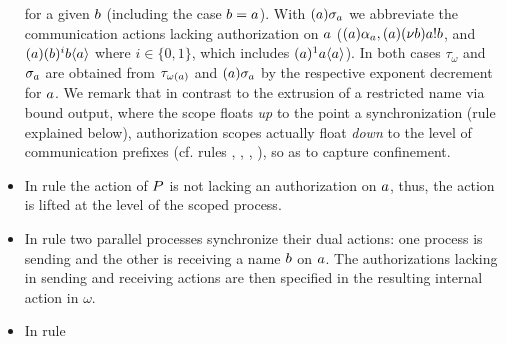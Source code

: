 \begin{itemize}
for a given $b$ (including the case $b = a$). With $(a)\sigma_a$ we abbreviate the communication actions lacking authorization on $a$ ($(a)\alpha_a, (a)(\nu b)a!b$, and 
$(a)(b)^ib\langle a\rangle$ where $i \in \{0,1\}$, which includes $ (a)^1a\langle a\rangle$). 
In both cases $\tau_\omega$ and $\sigma_a$ are obtained from $\tau_{\omega(a)}$ and $(a)\sigma_a$ by the respective exponent decrement for $a$.
%
We remark that in contrast to the extrusion of a restricted name via bound output, where the scope floats \emph{up} to the point a synchronization (rule  explained below), authorization scopes actually float \emph{down} to the level of communication prefixes (cf. rules , , , ), so as to capture confinement. 
\item 
In rule  the action of $P$ is not lacking an authorization on $a$, thus, the action is lifted at the level of the scoped process.
\item 
In rule  two parallel processes synchronize their dual actions: one process is sending and the other is receiving a name $b$ on $a$. %
The authorizations lacking in sending and receiving actions are then specified in the resulting internal action in $\omega$.
\item 
In rule  %

\end{itemize}
